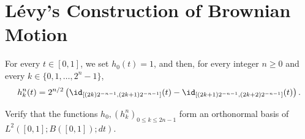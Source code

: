 \documentclass{scrartcl}
\begin{document}




\section{Lévy's Construction of Brownian Motion}

\begin{prob*}
    For every $t \in [0,1]$, we set $h_0(t) = 1$, and then, for every integer $n \geq 0$ and every $k \in \{0,1,\ldots,2^n-1\}$,
    \[
        h^n_k(t) = 2^{n/2} \left(\id_{[(2k)2^{-n-1},(2k+1)2^{-n-1}]}(t) - \id_{[(2k+1)2^{-n-1},(2k+2)2^{-n-1}]}(t)\right).  
    \]
\end{prob*}

\begin{prob}
    Verify that the functions $h_0, (h^n_k)_{0 \leq k \leq 2n-1}$ form an orthonormal basis of $L^2([0,1];B([0,1]);dt)$.
\end{prob}
\end{document}
